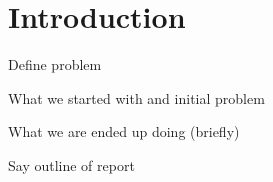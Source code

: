 \chapter{Introduction}

Define problem

What we started with and initial problem

What we are ended up doing (briefly)

Say outline of report
